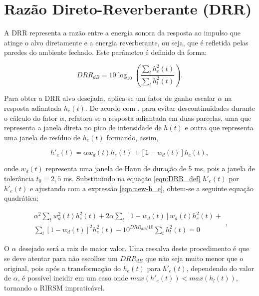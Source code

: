 \section{Razão Direto-Reverberante (DRR)}


A DRR representa a razão entre a energia sonora da resposta ao impulso que atinge o alvo diretamente e a energia reverberante,
ou seja, que é refletida pelas paredes do ambiente fechado. Este parâmetro é definido da forma:

\begin{equation} \label{eqn:DRR_def}
    DRR_{dB} = 10 \log_{10} \left( \frac{\sum_t h^2_e(t)}{\sum_t h^2_l(t)} \right).
\end{equation}

Para obter a DRR alvo desejada, aplica-se um fator de ganho escalar $\alpha$ na resposta adiantada $h_e(t)$.
De acordo com \cite{RIR_Data_Aug}, para evitar descontinuidades durante o cálculo do fator $\alpha$, refatora-se a
resposta adiantada em duas parcelas, uma que representa a janela direta no pico de intensidade de $h(t)$ e outra
que representa uma janela de resíduo de $h_e(t)$ formando, assim,

\begin{equation} \label{eqn:new-h_e}
    h'_e(t) = \alpha w_d(t) h_e(t) + [1 - w_d(t)]h_e(t),
\end{equation}

\noindent
onde $w_d(t)$ representa uma janela de Hann de duração de 5 ms, pois a janela de tolerância $t_0 = 2,5$ ms.
Substituindo na equação \ref{eqn:DRR_def} $h'_e(t)$ por $h'_e(t)$ e ajustando com a expressão \ref{eqn:new-h_e}, obtem-se
a seguinte equação quadrática;

\begin{equation} \label{eqn:DRR_quad_eqn}
    \begin{aligned} 
        \alpha^2 \sum_t w^2_d(t) h^2_e(t) +
        2 \alpha \sum_t [1 - w_d(t)] w_d(t) h^2_e(t) + \\
        \sum_t [1 - w_d(t)]^2 h^2_e(t) -
        10^{DRR_{dB}/10} \sum_t h^2_l(t)
        = 0
    \end{aligned}    
    ,
\end{equation}

O $\alpha$ desejado será a raiz de maior valor. 
Uma ressalva deste procedimento é que se deve atentar para não escolher um $DRR_{dB}$ que não seja muito menor que o original,
pois após a transformação do $h_e(t)$ para $h'_e(t)$, dependendo do valor de $\alpha$, é possível incidir em um caso onde
$max(h'_e(t)) < max(h_l(t))$, tornando a RIRSM impraticável.

